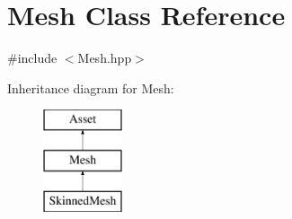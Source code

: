 \hypertarget{class_mesh}{}\section{Mesh Class Reference}
\label{class_mesh}


{\ttfamily \#include $<$Mesh.\+hpp$>$}

Inheritance diagram for Mesh\+:\begin{figure}[H]
\begin{center}
\leavevmode
\includegraphics[height=3.000000cm]{class_mesh}
\end{center}
\end{figure}
